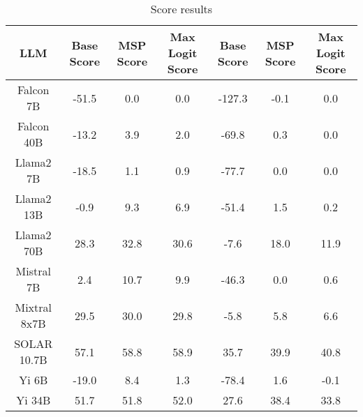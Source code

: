 \renewcommand\arraystretch{1.2}
\begin{table*}
\centering
\begin{tabular}{c|c|c|c|c|c|c}
LLM & Base Score & MSP Score & Max Logit Score & Base Score & MSP Score & Max Logit Score\\ \hline
Falcon 7B & -51.5 & 0.0 & 0.0 & -127.3 & -0.1 & 0.0\\
Falcon 40B & -13.2 & 3.9 & 2.0 & -69.8 & 0.3 & 0.0\\
Llama2 7B & -18.5 & 1.1 & 0.9 & -77.7 & 0.0 & 0.0\\
Llama2 13B & -0.9 & 9.3 & 6.9 & -51.4 & 1.5 & 0.2\\
Llama2 70B & 28.3 & 32.8 & 30.6 & -7.6 & 18.0 & 11.9\\
Mistral 7B & 2.4 & 10.7 & 9.9 & -46.3 & 0.0 & 0.6\\
Mixtral 8x7B & 29.5 & 30.0 & 29.8 & -5.8 & 5.8 & 6.6\\
SOLAR 10.7B & 57.1 & 58.8 & 58.9 & 35.7 & 39.9 & 40.8\\
Yi 6B & -19.0 & 8.4 & 1.3 & -78.4 & 1.6 & -0.1\\
Yi 34B & 51.7 & 51.8 & 52.0 & 27.6 & 38.4 & 33.8\\
\hline
\end{tabular}
\caption{Score results}
\end{table*}
\label{tab:score}
